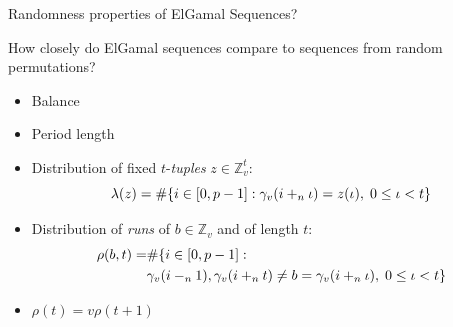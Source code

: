 \begin{frame}{Randomness properties of ElGamal Sequences?}
    
    \begin{center}
        How closely do ElGamal sequences compare to sequences from random permutations?
    \end{center}
    
    \begin{itemize}
        \item Balance
        \item Period length
        \item Distribution of fixed $t$-\emph{tuples} $z\in\mathbb{Z}_v^t$:
        $$\lambda(z) = \#{\{i \in [0,p-1]: \gamma_v(i+_{n} \iota) = z(\iota),\; 0 \leq \iota < t\}}$$
        \item  Distribution of \emph{runs} of $b\in\mathbb{Z}_v$ and of length $t$:
        \begin{align*}
            \rho(b,t) = & \#{ \{i \in [0,p-1]: }\\
                        &\gamma_v(i-_{n} 1),\gamma_v(i+_n t) \neq b = \gamma_v(i+_n\iota),\; 0 \leq \iota < t\}
        \end{align*}
        \item $\rho(t) = v \rho(t+1)$
    \end{itemize}
  
  \end{frame}